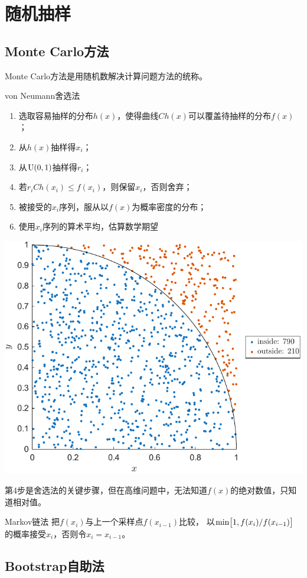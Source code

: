 \chapter{随机抽样}
\section{Monte Carlo方法}
Monte Carlo方法是用随机数解决计算问题方法的统称。
\begin{method}{von Neumann舍选法}{}
	\begin{enumerate}
		\item 选取容易抽样的分布$h(x)$，使得曲线$Ch(x)$可以覆盖待抽样的分布$f(x)$；
		\item 从$h(x)$抽样得$x_i$；
		\item 从$\operatorname{U}(0,1)$抽样得$r_i$；
		\item 若$r_iCh(x_i)\leqslant f(x_i)$，则保留$x_i$，否则舍弃；
		\item 被接受的$x_i$序列，服从以$f(x)$为概率密度的分布；
		\item 使用$x_i$序列的算术平均，估算数学期望
	\end{enumerate}
	\begin{center}
		\includegraphics[width=0.6\linewidth]{figures/monte_carlo.pdf}
		\label{fig:monte_carlo}
	\end{center}
\end{method}

\noindent
第4步是舍选法的关键步骤，但在高维问题中，无法知道$f(x)$的绝对数值，只知道相对值。

\begin{method}{Markov链法}{}
	把$f(x_i)$与上一个采样点$f(x_{i-1})$比较，
	以$\min\bigl[1,f(x_i)/f(x_{i-1})\bigr]$的概率接受$x_i$，否则令$x_i=x_{i-1}$。
\end{method}

\section{Bootstrap自助法}

